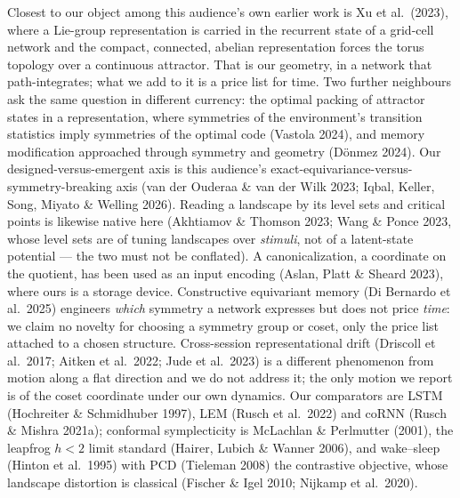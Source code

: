 \documentclass{article}
\begin{document}
Closest to our object among this audience's own earlier work is Xu et al.\ (2023), where a Lie-group representation is carried in the recurrent state of a grid-cell network and the compact, connected, abelian representation forces the torus topology over a continuous attractor. That is our geometry, in a network that path-integrates; what we add to it is a price list for time. Two further neighbours ask the same question in different currency: the optimal packing of attractor states in a representation, where symmetries of the environment's transition statistics imply symmetries of the optimal code (Vastola 2024), and memory modification approached through symmetry and geometry (D\"onmez 2024). Our designed-versus-emergent axis is this audience's exact-equivariance-versus-symmetry-breaking axis (van der Ouderaa \& van der Wilk 2023; Iqbal, Keller, Song, Miyato \& Welling 2026). Reading a landscape by its level sets and critical points is likewise native here (Akhtiamov \& Thomson 2023; Wang \& Ponce 2023, whose level sets are of tuning landscapes over \emph{stimuli}, not of a latent-state potential --- the two must not be conflated). A canonicalization, a coordinate on the quotient, has been used as an input encoding (Aslan, Platt \& Sheard 2023), where ours is a storage device. Constructive equivariant memory (Di Bernardo et al.\ 2025) engineers \emph{which} symmetry a network expresses but does not price \emph{time}: we claim no novelty for choosing a symmetry group or coset, only the price list attached to a chosen structure. Cross-session representational drift (Driscoll et al.\ 2017; Aitken et al.\ 2022; Jude et al.\ 2023) is a different phenomenon from motion along a flat direction and we do not address it; the only motion we report is of the coset coordinate under our own dynamics. Our comparators are LSTM (Hochreiter \& Schmidhuber 1997), LEM (Rusch et al.\ 2022) and coRNN (Rusch \& Mishra 2021a); conformal symplecticity is McLachlan \& Perlmutter (2001), the leapfrog $h<2$ limit standard (Hairer, Lubich \& Wanner 2006), and wake--sleep (Hinton et al.\ 1995) with PCD (Tieleman 2008) the contrastive objective, whose landscape distortion is classical (Fischer \& Igel 2010; Nijkamp et al.\ 2020).
\end{document}

